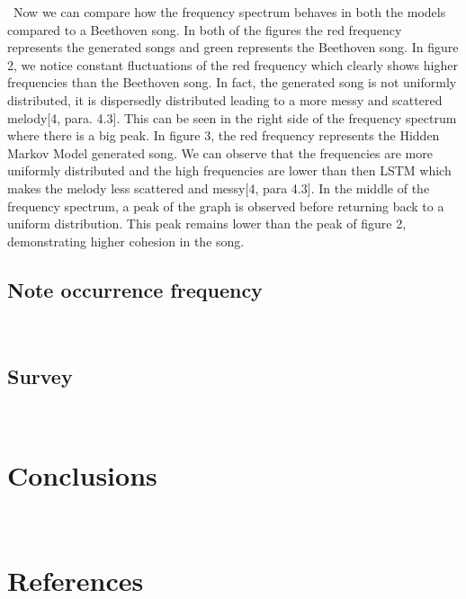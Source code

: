 \documentclass[12pt]{article}
\begin{document}
\begin{flushright}
  \begin{minipage}[t]{0.96\linewidth}\
    Now we can compare how the frequency spectrum behaves in both the models compared to a Beethoven song. In both of the figures the red frequency represents the generated songs and green represents the Beethoven song. In figure 2, we notice constant fluctuations of the red frequency which clearly shows higher frequencies than the Beethoven song. In fact, the generated song is not uniformly distributed, it is dispersedly distributed leading to a more messy and scattered melody[4, para. 4.3]. This can be seen in the right side of the frequency spectrum where there is a big peak. In figure 3, the red frequency represents the Hidden Markov Model generated song. We can observe that the frequencies are more uniformly distributed and the high frequencies are lower than then LSTM which makes the melody less scattered and messy[4, para 4.3]. In the middle of the frequency spectrum, a peak of the graph is observed before returning back to a uniform distribution. This peak remains lower than the peak of figure 2, demonstrating higher cohesion in the song.
  \end{minipage}
\end{flushright}
\subsection*{Note occurrence frequency}
\begin{flushright}
  \begin{minipage}[t]{0.96\linewidth}\

  \end{minipage}
\end{flushright}
\subsection*{Survey}
\begin{flushright}
  \begin{minipage}[t]{0.96\linewidth}\

  \end{minipage}
\end{flushright}
\section*{Conclusions}
\begin{flushright}
  \begin{minipage}[t]{0.96\linewidth}\

  \end{minipage}
\end{flushright}
\section*{References}
\begin{flushright}
  \begin{minipage}[t]{0.96\linewidth}\

  \end{minipage}
\end{flushright}
\end{document}
